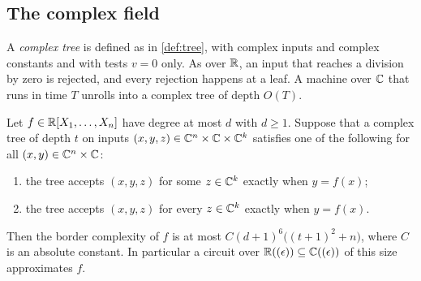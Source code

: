 \subsection{The complex field}\label{sec:universal-complex}

A \emph{complex tree} is defined as in \cref{def:tree}, with complex inputs and complex constants and with tests $v=0$ only. As over $\mathbb{R}$, an input that reaches a division by zero is rejected, and every rejection happens at a leaf. A machine over $\mathbb{C}$ that runs in time $T$ unrolls into a complex tree of depth $O(T)$.

\begin{theorem}\label{thm:complex}
Let $f\in\mathbb{R}[X_1,\dots,X_n]$ have degree at most $d$ with $d\ge1$. Suppose that a complex tree of depth $t$ on inputs $(x,y,z)\in\mathbb{C}^n\times\mathbb{C}\times\mathbb{C}^k$ satisfies one of the following for all $(x,y)\in\mathbb{C}^n\times\mathbb{C}$:
\begin{enumerate}[label=\textup{(\alph*)}]
\item the tree accepts $(x,y,z)$ for some $z\in\mathbb{C}^k$ exactly when $y=f(x)$;
\item the tree accepts $(x,y,z)$ for every $z\in\mathbb{C}^k$ exactly when $y=f(x)$.
\end{enumerate}
Then the border complexity of $f$ is at most $C(d+1)^6\bigl((t+1)^2+n\bigr)$, where $C$ is an absolute constant. In particular a circuit over $\mathbb{R}((\epsilon))\subseteq\mathbb{C}((\epsilon))$ of this size approximates $f$.
\end{theorem}

